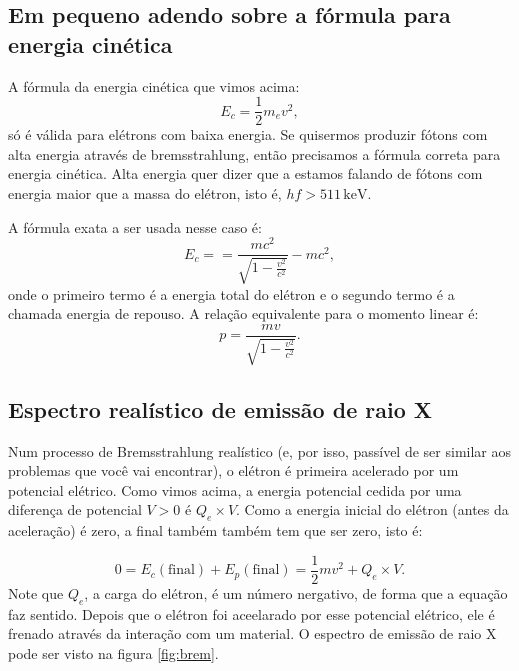 \documentclass{article}
\begin{document}
\subsection{Em pequeno adendo sobre a f\'ormula para energia cin\'etica}

A f\'ormula da energia cin\'etica que vimos acima:
\begin{equation}
E_c = \frac{1}{2}m_ev^2,
\end{equation}
s\'o \'e v\'alida para el\'etrons com baixa energia. Se quisermos produzir f\'otons com alta energia atrav\'es de bremsstrahlung, ent\~ao precisamos a f\'ormula correta para energia cin\'etica. Alta energia quer dizer que a estamos falando de f\'otons com energia maior que a massa do el\'etron, isto \'e, $hf > 511\,\text{keV}$.

A f\'ormula exata a ser usada nesse caso \'e:
\begin{equation}
E_c = = \frac{mc^{2}}{\sqrt{1-\frac{v^2}{c^2}}} - mc^2,
\end{equation}
onde o primeiro termo \'e a energia total do el\'etron e o segundo termo \'e a chamada energia de repouso. A rela\c c\~ao equivalente para o momento linear \'e:
\begin{equation}
p = \frac{mv}{\sqrt{1-\frac{v^2}{c^2}}}.
\end{equation}

\subsection{Espectro real\'istico de emissão de raio X}
Num processo de Bremsstrahlung real\'istico (e, por isso, pass\'ivel de ser similar aos problemas que voc\^e vai encontrar), o el\'etron \'e primeira acelerado por um potencial el\'etrico. Como vimos acima, a energia potencial cedida por uma diferen\c ca de potencial $V>0$ \'e $Q_e\times V$. Como a energia inicial do el\'etron (antes da acelera\c c\~ao) \'e zero, a final tamb\'em tamb\'em tem que ser zero, isto \'e:

\begin{equation}
0 = E_c(\text{final}) + E_p(\text{final}) = \frac{1}{2}mv^2 + Q_e\times V.
\end{equation}
Note que $Q_e$, a carga do el\'etron, \'e um n\'umero nergativo, de forma que a equa\c c\~ao faz sentido. Depois que o el\'etron foi aceelarado por esse potencial el\'etrico, ele \'e frenado atrav\'es da intera\c c\~ao com um material. O espectro de emiss\~ao de raio X pode ser visto na figura \ref{fig:brem}.
\end{document}
